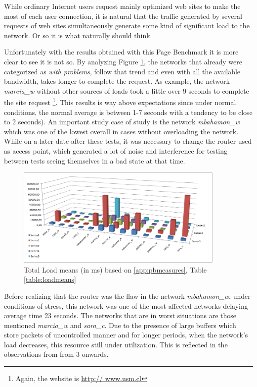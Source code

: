 While ordinary Internet users request mainly optimized  web sites to make the
most of each user connection, it is natural that the traffic generated by
several requests of web sites simultaneously generate some kind of significant
load to the network. Or so it is what naturally should think.

Unfortunately with the results obtained with this Page Benchmark it is more
clear to see it is not so. By analyzing Figure \ref{fig:loadmeans}, the
networks that already were categorized as \textit{with problems}, follow that
trend and even with all the available bandwidth, takes longer to complete the
request. As example, the network \textit{marcia\_w} without other sources of
loads took a little over 9 seconds to complete the site request \footnote
{Again, the website is \url{http:// www.usm.cl}}. This results is way above
expectations since under normal conditions, the normal average is between 1-7
seconds with a tendency to be close to 2 seconds). An important study case of
study is the network \textit{mbahamon\_w} which was one of the lowest overall
in cases without overloading the network. While on a later date after these
tests, it was necessary to change the router used as access point, which
generated a lot of noise and interference for testing between tests seeing
themselves in a bad state at that time.

\begin{figure}[ht]
\centering
    \includegraphics[width=0.9\textwidth]{img/measures_page}
\caption[Page Benchmark: Total Load Means]{ Total Load means (in ms) based on \ref{app:pbmeasures}, Table \ref{table:loadmeans}}
\label{fig:loadmeans}
\end{figure}%

Before realizing that the router was the flaw in the network
\textit{mbahamon\_w}, under conditions of stress, this network was one of the
most affected networks delaying average time 23 seconds. The networks that are
in worst situations are those mentioned \textit{marcia\_w} and
\textit{sara\_c}. Due to the presence of large buffers which store packets of
uncontrolled manner and for longer periods, when the network's load decreases,
this resource  still under utilization. This is reflected in the observations
from from 3 onwards.

